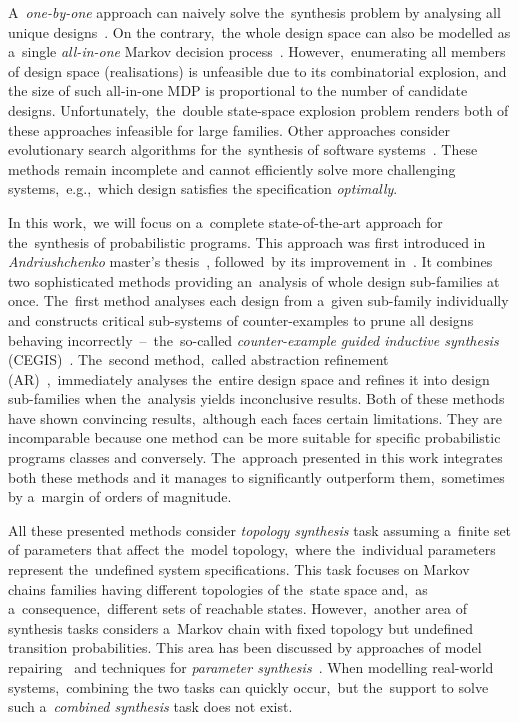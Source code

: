 A~\textit{one-by-one} approach can naively solve the~synthesis problem by analysing all unique designs~\cite{spl3,onebyone}.
On the contrary,~the whole design space can also be modelled as a~single \textit{all-in-one} Markov decision process~\cite{spl3,allinone}.
However,~enumerating all members of design space (realisations) is unfeasible due to its combinatorial explosion, and the size of such all-in-one MDP is proportional to the number of candidate designs.
Unfortunately,~the~double state-space explosion problem renders both of these approaches infeasible for large families.
Other approaches consider evolutionary search algorithms for the~synthesis of software systems~\cite{spl2}.
These methods remain incomplete and cannot efficiently solve more challenging systems,~e.g.,~which design satisfies the specification \textit{optimally}.

In this work,~we will focus on a~complete state-of-the-art approach for the~synthesis of probabilistic programs.
This approach was first introduced in \textit{Andriushchenko} master’s thesis~\cite{roman-DP}, followed~by its improvement in~\cite{tacas21}.
It combines two sophisticated methods providing an~analysis of whole design sub-families at once.
The~first method analyses each design from a~given sub-family individually and constructs critical sub-systems of counter-examples to prune all designs behaving incorrectly \,--\, the~so-called \textit{counter-example guided inductive synthesis} (CEGIS)~\cite{cegis}.
The~second method,~called abstraction refinement (AR)~\cite{cegar},~immediately analyses the~entire design space and refines it into design sub-families when the~analysis yields inconclusive results.
Both of these methods have shown convincing results,~although each faces certain limitations.
They are incomparable because one method can be more suitable for specific probabilistic programs classes and conversely.
The~approach presented in this work integrates both these methods and it manages to significantly outperform them,~sometimes by a~margin of orders of magnitude.

All these presented methods consider \textit{topology synthesis} task assuming a~finite set of parameters that affect the~model topology,~where the~individual parameters represent the~undefined system specifications.
This task focuses on Markov chains families having different topologies of the~state space and,~as a~consequence,~different sets of reachable states.
However,~another area of synthesis tasks considers a~Markov chain with fixed topology but undefined transition probabilities.
This area has been discussed by approaches of model repairing~\cite{model-repair-1,pathak-et-al-nfm-2015} and techniques for \textit{parameter synthesis}~\cite{ceska2014robustness,Quatmann2016}.
When modelling real-world systems,~combining the two tasks can quickly occur,~but the~support to solve such a~\textit{combined synthesis} task does not exist.

